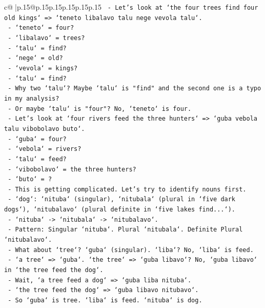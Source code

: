 \documentclass{article}
\begin{document}
{\begin{supertabular}{c@{$\;$}|p{.15\linewidth}@{}p{.15\linewidth}p{.15\linewidth}p{.15\linewidth}p{.15\linewidth}p{.15\linewidth}}
{{{\texttt{      {-} Let's look at `the four trees find four old kings` => `teneto libalavo talu nege vevola talu`.} \\
\texttt{        {-} `teneto` = four?} \\
\texttt{        {-} `libalavo` = trees?} \\
\texttt{        {-} `talu` = find?} \\
\texttt{        {-} `nege` = old?} \\
\texttt{        {-} `vevola` = kings?} \\
\texttt{        {-} `talu` = find?} \\
\texttt{        {-} Why two `talu`? Maybe `talu` is "find" and the second one is a typo in my analysis?} \\
\texttt{        {-} Or maybe `talu` is "four"? No, `teneto` is four.} \\
\texttt{        {-} Let's look at `four rivers feed the three hunters` => `guba vebola talu vibobolavo buto`.} \\
\texttt{          {-} `guba` = four?} \\
\texttt{          {-} `vebola` = rivers?} \\
\texttt{          {-} `talu` = feed?} \\
\texttt{          {-} `vibobolavo` = the three hunters?} \\
\texttt{          {-} `buto` = ?} \\
\texttt{        {-} This is getting complicated. Let's try to identify nouns first.} \\
\texttt{        {-} `dog`: `nituba` (singular), `nitubala` (plural in `five dark dogs`), `nitubalavo` (plural definite in `five lakes find...`).} \\
\texttt{          {-} `nituba` {-}> `nitubala` {-}> `nitubalavo`.} \\
\texttt{          {-} Pattern: Singular `nituba`. Plural `nitubala`. Definite Plural `nitubalavo`.} \\
\texttt{          {-} What about `tree`? `guba` (singular). `liba`? No, `liba` is feed.} \\
\texttt{          {-} `a tree` => `guba`. `the tree` => `guba libavo`? No, `guba libavo` in `the tree feed the dog`.} \\
\texttt{          {-} Wait, `a tree feed a dog` => `guba liba nituba`.} \\
\texttt{          {-} `the tree feed the dog` => `guba libavo nitubavo`.} \\
\texttt{          {-} So `guba` is tree. `liba` is feed. `nituba` is dog.} \\
}}}
\end{supertabular}}
\end{document}
